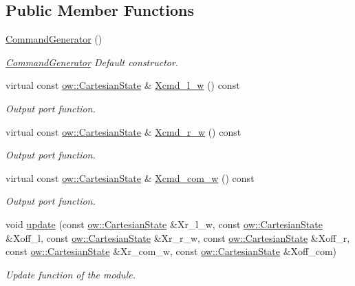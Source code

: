 \subsection*{Public Member Functions}
\begin{DoxyCompactItemize}
\item 
\hyperlink{classow__cmd__gen_1_1CommandGenerator_a08f143362a609f6342906294a2edd3f0}{Command\+Generator} ()\hypertarget{classow__cmd__gen_1_1CommandGenerator_a08f143362a609f6342906294a2edd3f0}{}\label{classow__cmd__gen_1_1CommandGenerator_a08f143362a609f6342906294a2edd3f0}

\begin{DoxyCompactList}\small\item\em \hyperlink{classow__cmd__gen_1_1CommandGenerator}{Command\+Generator} Default constructor. \end{DoxyCompactList}\item 
virtual const \hyperlink{classow__core_1_1CartesianState}{ow\+::\+Cartesian\+State} \& \hyperlink{classow__cmd__gen_1_1CommandGenerator_a922b9defd16847ef9cba70ed56c6019e}{Xcmd\+\_\+l\+\_\+w} () const 
\begin{DoxyCompactList}\small\item\em Output port function. \end{DoxyCompactList}\item 
virtual const \hyperlink{classow__core_1_1CartesianState}{ow\+::\+Cartesian\+State} \& \hyperlink{classow__cmd__gen_1_1CommandGenerator_afd5c10bd19ed610f63c73a5516961584}{Xcmd\+\_\+r\+\_\+w} () const 
\begin{DoxyCompactList}\small\item\em Output port function. \end{DoxyCompactList}\item 
virtual const \hyperlink{classow__core_1_1CartesianState}{ow\+::\+Cartesian\+State} \& \hyperlink{classow__cmd__gen_1_1CommandGenerator_a104f8f57b30db712328970907f269f69}{Xcmd\+\_\+com\+\_\+w} () const 
\begin{DoxyCompactList}\small\item\em Output port function. \end{DoxyCompactList}\item 
void \hyperlink{classow__cmd__gen_1_1CommandGenerator_a891d7e8183966ce863aa1adb69ee9c87}{update} (const \hyperlink{classow__core_1_1CartesianState}{ow\+::\+Cartesian\+State} \&Xr\+\_\+l\+\_\+w, const \hyperlink{classow__core_1_1CartesianState}{ow\+::\+Cartesian\+State} \&Xoff\+\_\+l, const \hyperlink{classow__core_1_1CartesianState}{ow\+::\+Cartesian\+State} \&Xr\+\_\+r\+\_\+w, const \hyperlink{classow__core_1_1CartesianState}{ow\+::\+Cartesian\+State} \&Xoff\+\_\+r, const \hyperlink{classow__core_1_1CartesianState}{ow\+::\+Cartesian\+State} \&Xr\+\_\+com\+\_\+w, const \hyperlink{classow__core_1_1CartesianState}{ow\+::\+Cartesian\+State} \&Xoff\+\_\+com)
\begin{DoxyCompactList}\small\item\em Update function of the module. \end{DoxyCompactList}\end{DoxyCompactItemize}
